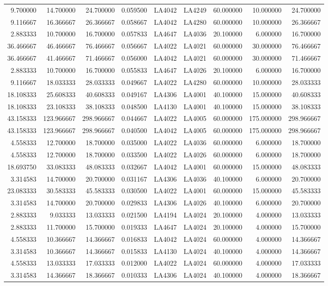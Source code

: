\begin{tabular}{rrrrllrrr}
9.700000 & 14.700000 & 24.700000 & 0.059500 & LA4042 & LA4249 & 60.000000 & 10.000000 & 24.700000 \\
9.116667 & 16.366667 & 26.366667 & 0.058667 & LA4042 & LA4280 & 60.000000 & 10.000000 & 26.366667 \\
2.883333 & 10.700000 & 16.700000 & 0.057833 & LA4647 & LA4036 & 20.100000 & 6.000000 & 16.700000 \\
36.466667 & 46.466667 & 76.466667 & 0.056667 & LA4022 & LA4021 & 60.000000 & 30.000000 & 76.466667 \\
36.466667 & 41.466667 & 71.466667 & 0.056000 & LA4042 & LA4021 & 60.000000 & 30.000000 & 71.466667 \\
2.883333 & 10.700000 & 16.700000 & 0.055833 & LA4647 & LA4026 & 20.100000 & 6.000000 & 16.700000 \\
9.116667 & 18.033333 & 28.033333 & 0.049667 & LA4022 & LA4280 & 60.000000 & 10.000000 & 28.033333 \\
18.108333 & 25.608333 & 40.608333 & 0.049167 & LA4306 & LA4001 & 40.100000 & 15.000000 & 40.608333 \\
18.108333 & 23.108333 & 38.108333 & 0.048500 & LA4130 & LA4001 & 40.100000 & 15.000000 & 38.108333 \\
43.158333 & 123.966667 & 298.966667 & 0.044667 & LA4022 & LA4005 & 60.000000 & 175.000000 & 298.966667 \\
43.158333 & 123.966667 & 298.966667 & 0.040500 & LA4042 & LA4005 & 60.000000 & 175.000000 & 298.966667 \\
4.558333 & 12.700000 & 18.700000 & 0.035000 & LA4022 & LA4036 & 60.000000 & 6.000000 & 18.700000 \\
4.558333 & 12.700000 & 18.700000 & 0.033500 & LA4022 & LA4026 & 60.000000 & 6.000000 & 18.700000 \\
18.693750 & 33.083333 & 48.083333 & 0.032667 & LA4042 & LA4001 & 60.000000 & 15.000000 & 48.083333 \\
3.314583 & 14.700000 & 20.700000 & 0.031167 & LA4306 & LA4036 & 40.100000 & 6.000000 & 20.700000 \\
23.083333 & 30.583333 & 45.583333 & 0.030500 & LA4022 & LA4001 & 60.000000 & 15.000000 & 45.583333 \\
3.314583 & 14.700000 & 20.700000 & 0.029833 & LA4306 & LA4026 & 40.100000 & 6.000000 & 20.700000 \\
2.883333 & 9.033333 & 13.033333 & 0.021500 & LA4194 & LA4024 & 20.100000 & 4.000000 & 13.033333 \\
2.883333 & 11.700000 & 15.700000 & 0.019333 & LA4647 & LA4024 & 20.100000 & 4.000000 & 15.700000 \\
4.558333 & 10.366667 & 14.366667 & 0.016833 & LA4042 & LA4024 & 60.000000 & 4.000000 & 14.366667 \\
3.314583 & 10.366667 & 14.366667 & 0.015833 & LA4130 & LA4024 & 40.100000 & 4.000000 & 14.366667 \\
4.558333 & 13.033333 & 17.033333 & 0.012000 & LA4022 & LA4024 & 60.000000 & 4.000000 & 17.033333 \\
3.314583 & 14.366667 & 18.366667 & 0.010333 & LA4306 & LA4024 & 40.100000 & 4.000000 & 18.366667 \\
\bottomrule
\end{tabular}
